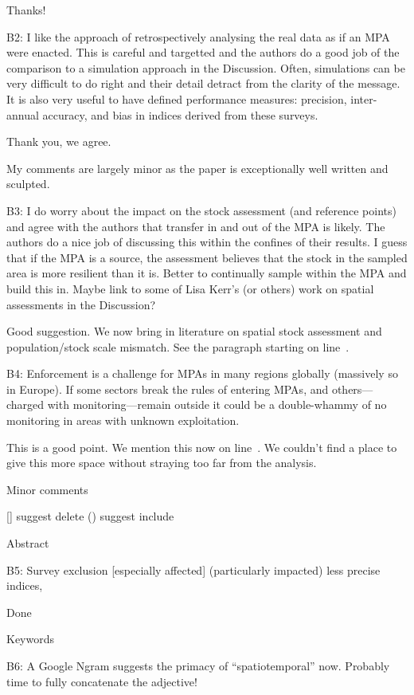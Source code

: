 \documentclass[12pt]{article}
\newcommand{\rev}[1]{{\color{niceblue} #1}}
\newcommand{\lr}[1]{line~\lineref{#1}}
\begin{document}
Thanks!

\rev{B2: I like the approach of retrospectively analysing the real data as if an MPA were enacted. This is careful and targetted and the authors do a good job of the comparison to a simulation approach in the Discussion. Often, simulations can be very difficult to do right and their detail detract from the clarity of the message. It is also very useful to have defined performance measures: precision, inter-annual accuracy, and bias in indices derived from these surveys.}

Thank you, we agree.

\rev{My comments are largely minor as the paper is exceptionally well written and sculpted.}

\rev{B3: I do worry about the impact on the stock assessment (and reference points) and agree with the authors that transfer in and out of the MPA is likely. The authors do a nice job of discussing this within the confines of their results. I guess that if the MPA is a source, the assessment believes that the stock in the sampled area is more resilient than it is. Better to continually sample within the MPA and build this in. Maybe link to some of Lisa Kerr’s (or others) work on spatial assessments in the Discussion?}

Good suggestion. We now bring in literature on spatial stock assessment and population/stock scale mismatch. See the paragraph starting on \lr{B3}.

\rev{B4: Enforcement is a challenge for MPAs in many regions globally (massively so in Europe). If some sectors break the rules of entering MPAs, and others---charged with monitoring---remain outside it could be a double-whammy of no monitoring in areas with unknown exploitation.}

This is a good point. We mention this now on \lr{B4}. We couldn't find a place to give this more space without straying too far from the analysis.

\rev{Minor comments}

\rev{[] suggest delete () suggest include}

\rev{Abstract}

\rev{B5: Survey exclusion [especially affected] (particularly impacted) less precise indices,}

Done

\rev{Keywords}

\rev{B6: A Google Ngram suggests the primacy of “spatiotemporal” now. Probably time to
fully concatenate the adjective!}
\end{document}
